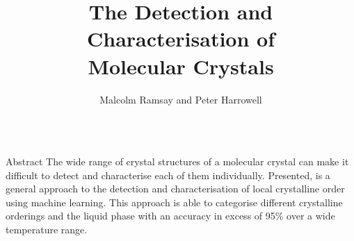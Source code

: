 \documentclass{beamer}
\title{The Detection and Characterisation of \\\vspace{0.3em} Molecular Crystals}
\author{Malcolm Ramsay and Peter Harrowell}
\institute{School of Chemistry, The University of Sydney}
\begin{document}
\begin{frame}[t]{}
  \begin{columns}[t]

    \begin{column}{0.47\linewidth}

      \begin{block}{Abstract}
        The wide range of crystal structures of a molecular crystal
        can make it difficult to detect and characterise each of them individually.
        Presented, is a general approach to the detection and characterisation
        of local crystalline order using machine learning.
        This approach is able to categorise different crystalline orderings and the liquid phase
        with an accuracy in excess of 95\% over a wide temperature range.
      \end{block}


\end{column}
\end{columns}
\end{frame}
\end{document}
